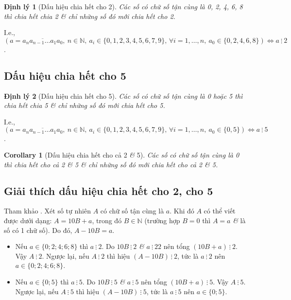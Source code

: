 \documentclass[oneside]{book}
\numberwithin{equation}{section}
\newtheorem{corollary}{Corollary}[section]
\newtheorem{dinhly}{Định lý}[section]
\begin{document}
\begin{dinhly}[Dấu hiệu chia hết cho 2]
	Các số có chữ số tận cùng là 0, 2, 4, 6, 8 thì chia hết chia 2 \textit{\&} chỉ những số đó mới chia hết cho 2.
\end{dinhly}
I.e., $(a = \overline{a_na_{n-1}\ldots a_1a_0},\ n\in\mathbb{N},\ a_i\in\{0,1,2,3,4,5,6,7,9\},\,\forall i = 1,\ldots,n,\ a_0\in\{0,2,4,6,8\})\Leftrightarrow a\ \vdots\ 2$.

\subsection{Dấu hiệu chia hết cho 5}
\begin{dinhly}[Dấu hiệu chia hết cho 5]
	Các số có chữ số tận cùng là 0 hoặc 5 thì chia hết chia 5 \textit{\&} chỉ những số đó mới chia hết cho 5.
\end{dinhly}
I.e., $(a = \overline{a_na_{n-1}\ldots a_1a_0},\ n\in\mathbb{N},\ a_i\in\{0,1,2,3,4,5,6,7,9\},\,\forall i = 1,\ldots,n,\ a_0\in\{0,5\})\Leftrightarrow a\ \vdots\ 5$.

\begin{corollary}[Dấu hiệu chia hết cho cả 2 \textit{\&} 5]
	Các số có chữ số tận cùng là 0 thì chia hết cho cả 2 \textit{\&} 5 \textit{\&} chỉ những số đó mới chia hết cho cả 2 \textit{\&} 5.
\end{corollary}

\subsection{Giải thích dấu hiệu chia hết cho 2, cho 5}
Tham khảo \cite[p. 37]{Thai_Anh_Dat_Ha_Loan_Nam_Quang_Toan_6_tap_1}. Xét số tự nhiên $A$ có chữ số tận cùng là $a$. Khi đó $A$ có thể viết được dưới dạng: $A = 10B + a$, trong đó $B\in\mathbb{N}$ (trường hợp $B = 0$ thì $A = a$ \textit{\&} là số có 1 chữ số). Do đó, $A - 10 B = a$.
\begin{itemize}
	\item Nếu $a\in\{0;2;4;6;8\}$ thì $a\ \vdots\ 2$. Do $10B\ \vdots\ 2$ \textit{\&} $a\ \vdots\ 2 2$ nên tổng $(10B + a)\ \vdots\ 2$. Vậy $A\ \vdots\ 2$. Ngược lại, nếu $A\ \vdots\ 2$ thì hiệu $(A - 10B)\ \vdots\ 2$, tức là $a\ \vdots\ 2$ nên $a\in\{0;2;4;6;8\}$.
	\item Nếu $a\in\{0;5\}$ thì $a\ \vdots\ 5$. Do $10B\ \vdots\ 5$ \textit{\&} $a\ \vdots\ 5$ nên tổng $(10B + a)\ \vdots\ 5$. Vậy $A\ \vdots\ 5$. Ngược lại, nếu $A\ \vdots\ 5$ thì hiệu $(A - 10B)\ \vdots\ 5$, tức là $a\ \vdots\ 5$ nên $a\in\{0;5\}$.
\end{itemize}
\end{document}
